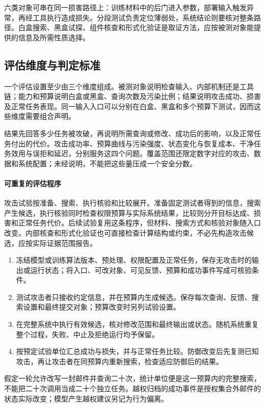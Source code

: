 六类对象可串在同一损害路径上：训练材料中的后门进入参数，部署输入触发异常，再经工具执行造成损失。分段测试负责定位薄弱处，系统结论则要核对整条路径。白盒搜索、黑盒试探、组件核查和形式化验证是取证方法，应按被测对象能提供的信息及所需性质选择。

\subsection{评估维度与判定标准}
\label{sec:security-risk-assessment}

一个评估设置至少由三个维度组成。被测对象说明检查输入、内部机制还是工具链；能力和预算说明白盒或黑盒、查询次数及污染比例；结果说明攻击成功、损害及正常任务表现。同一输入入口可以分别在白盒、黑盒和多个预算下测试，因而这些维度需要组合声明。

结果先回答多少任务被攻破，再说明所需查询或修改、成功后的影响，以及正常任务付出的代价。攻击成功率、预算曲线与污染强度、状态变化与恢复成本、干净任务效用与误拒和延迟，分别服务这四个问题。覆盖范围还限定数字对应的攻击、数据和系统配置；未经说明，不能把这些量压成一个安全分数。

\paragraph{可重复的评估程序}

攻击试验按准备、搜索、执行核验和比较展开。准备固定测试者得到的信息，搜索产生候选，执行核验同时检查权限预算与实际系统结果，比较则分开目标达成、损害和正常任务代价。后续试验复用这条程序，但材料、搜索方式和核验对象随入口改变。内部核查和形式化验证也可直接检查计算结构或约束，不必先构造攻击候选，应按实际证据范围报告。

\begin{enumerate}
 \item 冻结模型或训练算法版本、预处理、权限配置及正常任务，保存无攻击时的输出或运行状态；将入口、可改对象、可见反馈、预算和成功事件写成可核验条件。
 \item 测试攻击者只接收约定信息，并在预算内生成候选。保存每次查询、反馈、搜索设置和最终提交对象；预算改变时另列试验设置。
 \item 在完整系统中执行有效候选，核对修改范围和最终输出或状态。随机系统重复整个过程，失败、中止及拒绝运行均予保留。
 \item 按预定试验单位汇总成功与损失，并与正常任务比较。防御改变后先复测已知攻击，再让攻击者在同预算内重新搜索，检查适应防御后的结果。
\end{enumerate}

假定一轮允许改写一封邮件并查询二十次，统计单位便是这一预算内的完整搜索，不能把二十次调用当成二十个独立任务。越权归档的成功事件是授权集合外邮件的状态实际改变；模型产生越权建议另记为行为偏离。

